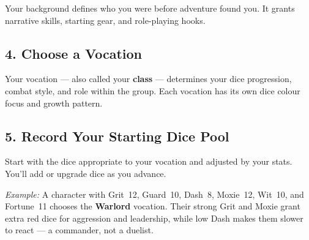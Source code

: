Your background defines who you were before adventure found you.
It grants narrative skills, starting gear, and role-playing hooks.

\subsection*{4. Choose a Vocation}

Your vocation — also called your \textbf{class} — determines your dice progression,
combat style, and role within the group.
Each vocation has its own dice colour focus and growth pattern.

\subsection*{5. Record Your Starting Dice Pool}

Start with the dice appropriate to your vocation and adjusted by your stats.
You’ll add or upgrade dice as you advance.

\medskip
\noindent
\textit{Example:}
A character with Grit~12, Guard~10, Dash~8, Moxie~12, Wit~10, and Fortune~11
chooses the \textbf{Warlord} vocation.
Their strong Grit and Moxie grant extra red dice for aggression and leadership,
while low Dash makes them slower to react — a commander, not a duelist.
